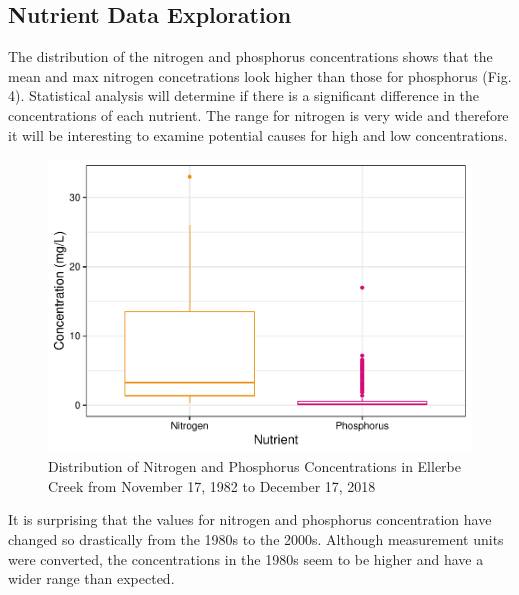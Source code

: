 \documentclass[12pt,]{article}
\begin{document}
\newpage

\hypertarget{nutrient-data-exploration}{%
\subsection{Nutrient Data Exploration}\label{nutrient-data-exploration}}

The distribution of the nitrogen and phosphorus concentrations shows
that the mean and max nitrogen concetrations look higher than those for
phosphorus (Fig. 4). Statistical analysis will determine if there is a
significant difference in the concentrations of each nutrient. The range
for nitrogen is very wide and therefore it will be interesting to
examine potential causes for high and low concentrations.

\begin{figure}
\centering
\includegraphics{Landman_ENV872_Project_files/figure-latex/Exploratory Analysis Figure 4-1.pdf}
\caption{Distribution of Nitrogen and Phosphorus Concentrations in
Ellerbe Creek from November 17, 1982 to December 17, 2018}
\end{figure}

It is surprising that the values for nitrogen and phosphorus
concentration have changed so drastically from the 1980s to the 2000s.
Although measurement units were converted, the concentrations in the
1980s seem to be higher and have a wider range than expected.
\end{document}
